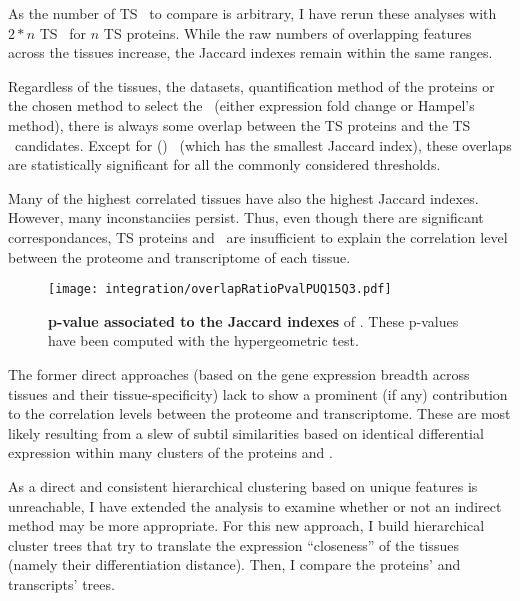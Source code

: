 As the number of \gls{TS} \mRNAs\ to compare is arbitrary,
I have rerun these analyses with $2*n$ \gls{TS} \mRNAs\ for $n$ \gls{TS} proteins.
While the raw numbers of overlapping features across the tissues increase,
the Jaccard indexes remain within the same ranges.

Regardless of the tissues, the datasets, quantification method of the proteins
or the chosen method to select the \mRNAs\
(either expression fold change or Hampel's method),
there is always some overlap between
the \gls{TS} proteins and the \gls{TS} \mRNAs\ candidates.
Except for () \bladder\ (which has the smallest Jaccard index),
these overlaps are statistically significant
for all the commonly considered thresholds.

\vspace{-2mm}
Many of the highest correlated tissues have also the highest Jaccard indexes.
However, many inconstanciies persist.
Thus, even though there are significant correspondances,
\gls{TS} proteins and \mRNAs\ are insufficient to explain
the correlation level between the proteome and transcriptome of each tissue.
\vspace{-\baselineskip}

\begin{figure}[!htb]
    \texttt{[image: integration/overlapRatioPvalPUQ15Q3.pdf]}\centering
    \vspace{1mm}
    \caption[p-values associated to the Jaccard indexes]{\label{fig:JaccardPvalues}\label{fig:pJacquard}%
    \textbf{p-value associated to the Jaccard indexes} of \Cref{fig:JaccardIndexes}.
    These p-values have been computed with the hypergeometric test.}
    \vspace{-3mm}
\end{figure}

The former direct approaches
(based on the gene expression breadth across tissues and their tissue-specificity)
lack to show a prominent (if any) contribution to the correlation levels
between the proteome and transcriptome.
These are most likely resulting
from a slew of subtil similarities
based on identical differential expression
within many clusters of the proteins and \mRNAs{}.%

As a direct and consistent hierarchical clustering
based on unique features is unreachable,
I have extended the analysis to examine whether or not an indirect method
may be more appropriate.
For this new approach,
I build hierarchical cluster trees that try to translate
the expression \enquote{closeness} of the tissues
(namely their differentiation distance).
Then, I compare the proteins' and transcripts' trees.\\
\vspace{-\baselineskip}

